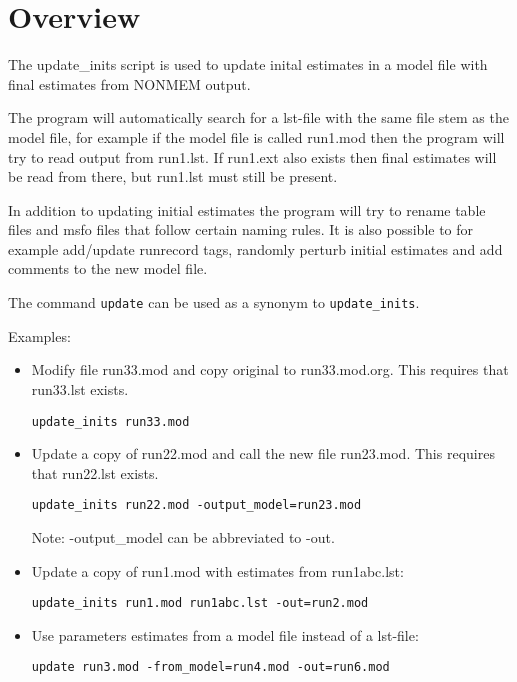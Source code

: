
\setlength{\evensidemargin}{0pt}
\setlength{\oddsidemargin}{0pt}




\maketitle


\section{Overview}
The update\_inits script is used to update inital estimates in a model file with final
estimates from NONMEM output.

The program will automatically search for a lst-file with the same file stem as the model file,
for example if the model file is called run1.mod then the program will try to read output from
run1.lst. If run1.ext also exists then final estimates will be read from there, 
but run1.lst must still be present.

In addition to updating initial estimates the program will try to rename table files and
msfo files that follow certain naming rules. It is also possible to for example
add/update runrecord tags,
randomly perturb initial estimates and add comments to the new model file.

The command \verb|update| can be used as a synonym to \verb|update_inits|.

\noindent Examples:
\begin{itemize}
\item Modify file run33.mod and copy original to run33.mod.org. This requires that run33.lst exists.
\begin{verbatim}
update_inits run33.mod
\end{verbatim}
\item Update a copy of run22.mod and call the new file run23.mod. This requires that run22.lst exists.
\begin{verbatim}
update_inits run22.mod -output_model=run23.mod
\end{verbatim}
Note: -output\_model can be abbreviated to -out.
\item Update a copy of run1.mod with estimates from run1abc.lst:
\begin{verbatim}
update_inits run1.mod run1abc.lst -out=run2.mod
\end{verbatim}

\item Use parameters estimates from a model file instead of a lst-file:
\begin{verbatim}
update run3.mod -from_model=run4.mod -out=run6.mod
\end{verbatim}
\end{itemize}

